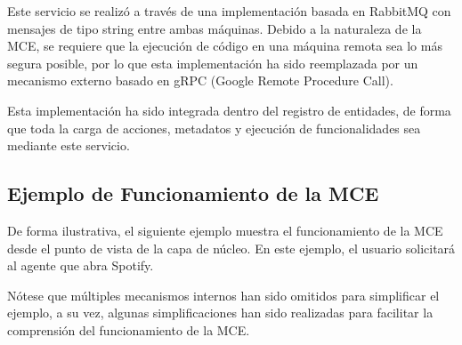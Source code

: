 Este servicio se realizó a través de una implementación basada en RabbitMQ con
mensajes de tipo string entre ambas máquinas. Debido a la naturaleza de la MCE, 
se requiere que la ejecución de código en una máquina remota sea lo más segura 
posible, por lo que esta implementación ha sido reemplazada por un mecanismo 
externo basado en gRPC (Google Remote Procedure Call).

Esta implementación ha sido integrada dentro del registro de entidades, de forma
que toda la carga de acciones, metadatos y ejecución de funcionalidades sea mediante
este servicio.

\subsection{Ejemplo de Funcionamiento de la MCE}
De forma ilustrativa, el siguiente ejemplo muestra el funcionamiento
de la MCE desde el punto de vista de la capa de núcleo. En este ejemplo,
el usuario solicitará al agente que abra Spotify.

Nótese que múltiples mecanismos internos han sido omitidos para
simplificar el ejemplo, a su vez, algunas simplificaciones han sido 
realizadas para facilitar la comprensión del funcionamiento de la MCE.

